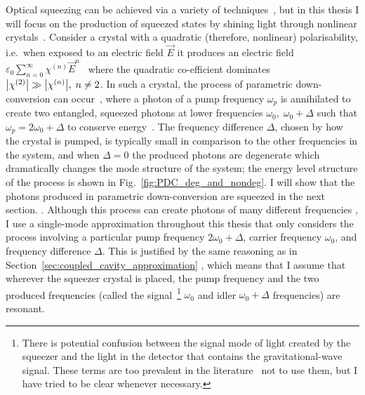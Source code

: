 Optical squeezing can be achieved via a variety of techniques~\cite{}, but in this thesis I will focus on the production of squeezed states by shining light through nonlinear crystals~\cite{}. Consider a crystal with a quadratic (therefore, nonlinear) polarisability, i.e.\ when exposed to an electric field $\vec E$ it produces an electric field $\varepsilon_0 \sum_{n=0}^\infty \chi^{(n)} {\vec E}^n$~\cite{ ref in Kirk thesis?}  where the quadratic co-efficient dominates $\abs{\chi^{(2)}}\gg\abs{\chi^{(n)}},\; n\neq2$. In such a crystal, the process of parametric down-conversion can occur~\cite{}, where a photon of a  pump frequency $\omega_p$ is annihilated to create two entangled, squeezed photons at lower frequencies $\omega_0,\; \omega_0+\Delta$ such that $\omega_p=2\omega_0+\Delta$ to conserve energy~\cite{}. The frequency difference $\Delta$, chosen by how the crystal is pumped, is typically small in comparison to the other frequencies in the system, and when $\Delta=0$ the produced photons are degenerate which dramatically changes the mode structure of the system; the energy level structure of the process is shown in Fig.~\ref{fig:PDC_deg_and_nondeg}. I will show that the photons produced in parametric down-conversion are squeezed in the next section. %
. Although this process can create photons of many different frequencies , I use a single-mode approximation throughout this thesis that only considers the process involving a particular pump frequency $2\omega_0+\Delta$, carrier frequency $\omega_0$, and frequency difference $\Delta$. This is justified by the same reasoning as in Section~\ref{sec:coupled_cavity_approximation} , %
which means that I assume that wherever the squeezer crystal is placed, the pump frequency and the two produced frequencies (called the signal~\footnote{There is potential confusion between the signal mode of light created by the squeezer and the light in the detector that contains the gravitational-wave signal. %
These terms are too prevalent in the literature~\cite{} not to use them, but I have tried to be clear whenever necessary.} $\omega_0$ and idler $\omega_0+\Delta$ frequencies) are resonant.

